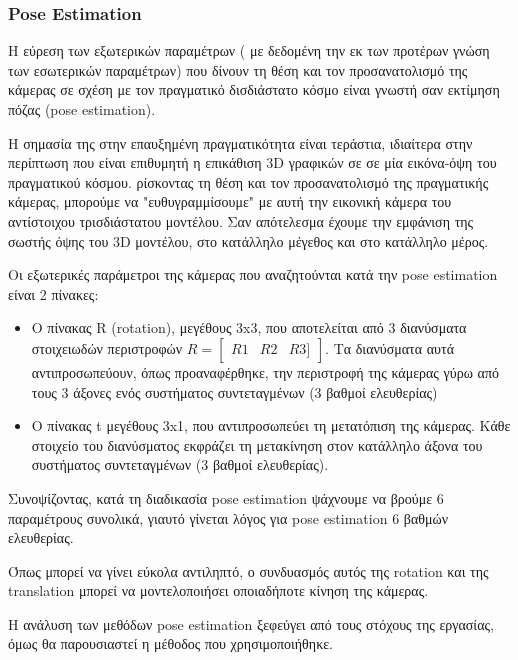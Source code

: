 \subsubsection{Pose Estimation}
Η εύρεση των εξωτερικών παραμέτρων ( με δεδομένη την εκ των προτέρων γνώση των εσωτερικών παραμέτρων) που δίνουν τη θέση και τον προσανατολισμό της κάμερας σε σχέση με τον πραγματικό δισδιάστατο κόσμο είναι γνωστή σαν εκτίμηση πόζας (pose estimation).

H σημασία της στην επαυξημένη πραγματικότητα είναι τεράστια, ιδιαίτερα στην περίπτωση που είναι επιθυμητή η επικάθιση 3D γραφικών σε σε μία εικόνα-όψη του πραγματικού κόσμου. ρίσκοντας τη θέση και τον προσανατολισμό της πραγματικής κάμερας, μπορούμε να "ευθυγραμμίσουμε" με αυτή την εικονική κάμερα του αντίστοιχου τρισδιάστατου μοντέλου. Σαν απότελεσμα έχουμε την εμφάνιση της σωστής όψης του 3D μοντέλου, στο κατάλληλο μέγεθος και στο κατάλληλο μέρος.

Οι εξωτερικές παράμετροι της κάμερας που αναζητούνται κατά την pose estimation είναι 2 πίνακες:

\begin{itemize}
\item Ο πίνακας R (rotation), μεγέθους 3x3, που αποτελείται από 3 διανύσματα στοιχειωδών περιστροφών $R=\begin{bmatrix} R1 & R2 & R3 ] \end{bmatrix}$. Τα διανύσματα αυτά αντιπροσωπεύουν, όπως προαναφέρθηκε, την περιστροφή της κάμερας γύρω από τους 3 άξονες ενός συστήματος συντεταγμένων (3 βαθμοί ελευθερίας)
\item Ο πίνακας t μεγέθους 3x1, που αντιπροσωπεύει τη μετατόπιση της κάμερας. Κάθε στοιχείο του διανύσματος εκφράζει τη μετακίνηση στον κατάλληλο άξονα του συστήματος συντεταγμένων (3 βαθμοί ελευθερίας).
\end{itemize}


Συνοψίζοντας, κατά τη διαδικασία pose estimation ψάχνουμε να βρούμε 6 παραμέτρους συνολικά, γιαυτό γίνεται λόγος για pose estimation 6 βαθμών ελευθερίας.

Όπως μπορεί να γίνει εύκολα αντιληπτό, ο συνδυασμός αυτός της rotation και της translation μπορεί να μοντελοποιήσει οποιαδήποτε κίνηση της κάμερας.


Η ανάλυση των μεθόδων pose estimation ξεφεύγει από τους στόχους της εργασίας, όμως θα παρουσιαστεί η μέθοδος που χρησιμοποιήθηκε.



